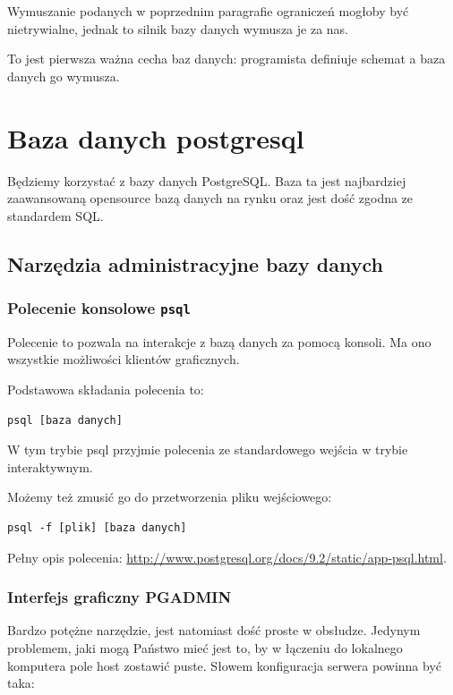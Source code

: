 \documentclass[a4paper]{article}
\begin{document}
Wymuszanie podanych w poprzednim paragrafie ograniczeń mogłoby być
nietrywialne, jednak to silnik bazy danych wymusza je za nas.

To jest pierwsza ważna cecha baz danych: programista definiuje
schemat a baza danych go wymusza.


\section{Baza danych postgresql%
  \label{baza-danych-postgresql}%
}

Będziemy korzystać z bazy danych PostgreSQL. Baza ta jest najbardziej
zaawansowaną opensource bazą danych na rynku oraz jest dość zgodna
ze standardem SQL.


\subsection{Narzędzia administracyjne bazy danych%
  \label{narzedzia-administracyjne-bazy-danych}%
}


\subsubsection{Polecenie konsolowe \texttt{psql}%
  \label{polecenie-konsolowe-psql}%
}

Polecenie to pozwala na interakcje z bazą danych za pomocą
konsoli. Ma ono wszystkie możliwości klientów
graficznych.

Podstawowa składania polecenia to:

\begin{verbatim}
psql [baza danych]
\end{verbatim}

W tym trybie psql przyjmie polecenia ze standardowego wejścia
w trybie interaktywnym.

Możemy też zmusić go do przetworzenia pliku wejściowego:

\begin{verbatim}
psql -f [plik] [baza danych]
\end{verbatim}

Pełny opis polecenia: \url{http://www.postgresql.org/docs/9.2/static/app-psql.html}.


\subsubsection{Interfejs graficzny PGADMIN%
  \label{interfejs-graficzny-pgadmin}%
}

Bardzo potężne narzędzie, jest natomiast dość proste w obsłudze.
Jedynym problemem, jaki mogą Państwo mieć jest to, by w łączeniu
do lokalnego komputera pole host zostawić puste.
Słowem  konfiguracja serwera powinna być taka:
\end{document}
